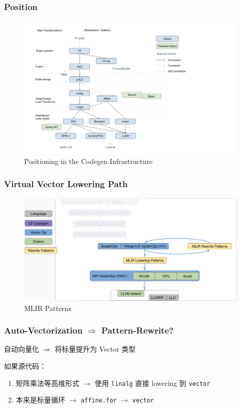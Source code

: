 \documentclass[aspectratio=169]{ctexbeamer}
\begin{document}
\begin{frame}
    \frametitle{Position}

    \begin{figure}
        \centering
        \includegraphics[width=0.56\linewidth]{images/position.png}
        \caption{Positioning in the Codegen Infrastructure}
    \end{figure}

\end{frame}

\begin{frame}
    \frametitle{Virtual Vector Lowering Path}

    \begin{figure}
        \centering
        \includegraphics[width=0.56\linewidth]{images/position2.png}
        \caption{MLIR Patterns}
    \end{figure}

\end{frame}

\begin{frame}
    \frametitle{Auto-Vectorization $\Rightarrow$ Pattern-Rewrite?}

    自动向量化 $\Rightarrow$ 将标量提升为 Vector 类型

    \hspace{2em}

    如果源代码：
    \begin{enumerate}
        \item 矩阵乘法等高维形式 $\rightarrow$ 使用 \texttt{linalg} 直接 lowering 到 \texttt{vector}
        \item 本来是标量循环 $\rightarrow$ \texttt{affine.for} $\rightarrow$ \texttt{vector}
    \end{enumerate}

\end{frame}
\end{document}
